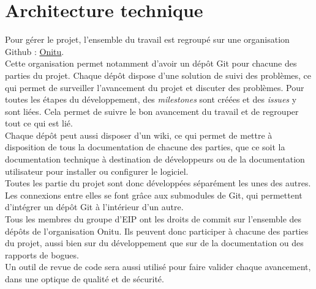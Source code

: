 \section{Architecture technique}
Pour gérer le projet, l'ensemble du travail est regroupé sur une organisation Github : \href{https://github.com/onitu/}{Onitu}.\\

Cette organisation permet notamment d'avoir un dépôt Git pour chacune des parties du projet. Chaque dépôt dispose d'une solution de suivi des problèmes, ce qui permet de surveiller l'avancement du projet et discuter des problèmes.
Pour toutes les étapes du développement, des \textit{milestones} sont créées et des \textit{issues} y sont liées. Cela permet de suivre le bon avancement du travail et de regrouper tout ce qui est lié.\\

Chaque dépôt peut aussi disposer d'un wiki, ce qui permet de mettre à disposition de tous la documentation de chacune des parties, que ce soit la documentation technique à destination de développeurs ou de la documentation utilisateur pour installer ou configurer le logiciel.\\

Toutes les partie du projet sont donc développées séparément les unes des autres. Les connexions entre elles se font grâce aux submodules de Git, qui permettent
 d'intégrer un dépôt Git à l'intérieur d'un autre.\\

Tous les membres du groupe d'EIP ont les droits de commit sur l'ensemble des dépôts de l'organisation Onitu. Ils peuvent donc participer à chacune des parties du projet, aussi bien sur du développement que sur de la documentation ou des rapports de bogues.\\

Un outil de revue de code sera aussi utilisé pour faire valider chaque avancement, dans une optique de qualité et de sécurité.

